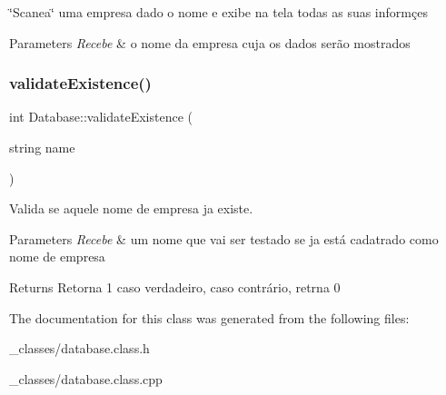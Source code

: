 \char`\"{}\+Scanea\char`\"{} uma empresa dado o nome e exibe na tela todas as suas informçes 


\begin{DoxyParams}{Parameters}
{\em Recebe} & o nome da empresa cuja os dados serão mostrados \\
\hline
\end{DoxyParams}
\mbox{\label{classDatabase_a558ad8e60c1dd382a773682cf9f9cd01}} 
\subsubsection{\texorpdfstring{validate\+Existence()}{validateExistence()}}
{\footnotesize\ttfamily int Database\+::validate\+Existence (\begin{DoxyParamCaption}\item[{string}]{name }\end{DoxyParamCaption})}



Valida se aquele nome de empresa ja existe. 


\begin{DoxyParams}{Parameters}
{\em Recebe} & um nome que vai ser testado se ja está cadatrado como nome de empresa \\
\hline
\end{DoxyParams}
\begin{DoxyReturn}{Returns}
Retorna 1 caso verdadeiro, caso contrário, retrna 0 
\end{DoxyReturn}


The documentation for this class was generated from the following files\+:\begin{DoxyCompactItemize}
\item 
\+\_\+classes/database.\+class.\+h\item 
\+\_\+classes/database.\+class.\+cpp\end{DoxyCompactItemize}
